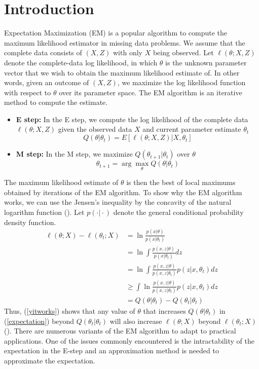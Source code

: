 \documentclass[11pt]{article}
\begin{document}
	\section{Introduction}
	Expectation Maximization (EM) is a popular algorithm to compute the maximum likelihood estimator in missing data problems. We assume that the complete data consists of $(X, Z)$ with only $X$ being observed. Let $\ell(\theta; X, Z)$ denote the complete-data log likelihood, in which $\theta$ is the unknown parameter vector that we wish to obtain the maximum likelihood estimate of. In other words, given an outcome of $(X, Z)$, we maximize the log likelihood function with respect to $\theta$ over its parameter space. The EM algorithm is an iterative method to compute the estimate.
	\begin{itemize}
		\item \textbf{E step:} In the E step, we compute the log likelihood of the complete data $\ell(\theta; X, Z)$ given the observed data $X$ and current parameter estimate $\theta_t$
		\begin{equation}
			\label{expectation}
			Q(\theta \vert \theta_t) = E [\ell(\theta; X, Z) \vert X, \theta_t]
		\end{equation}
		\item \textbf{M step:} In the M step, we maximize $Q(\theta_{t+1} \vert \theta_t)$ over $\theta$ 
		\begin{equation}
			\theta_{t+1} = \arg \max_\theta Q(\theta \vert \theta_t)
		\end{equation}
	\end{itemize}
	The maximum likelihood estimate of $\theta$ is then the best of local maximums obtained by iterations of the EM algorithm. To show why the EM algorithm works, we can use the Jensen's inequality by the concavity of the natural logarithm function (\cite{roche2011algorithm}). Let $p(\cdot \vert \cdot)$ denote the general conditional probability density function.
	\begin{equation}
		\label{yitworks}
		\begin{split}
			\ell(\theta; X) - \ell (\theta_t; X)
			& = \ln \frac{p(x\vert \theta)}{p( x \vert \theta_t) } \\
			& = \ln \int \frac{p(x, z\vert \theta)}{p( x \vert \theta_t)} dz\\
			& = \ln \int \frac{p(x, z\vert \theta)}{p( x,z \vert \theta_t)} p(z \vert x, \theta_t) dz \\
			& \geq \int \ln \frac{p(x, z\vert \theta)}{p( x,z \vert \theta_t)} p(z \vert x, \theta_t) dz \\
			& = Q(\theta \vert \theta_t) - Q(\theta_t \vert \theta_t)
		\end{split}
	\end{equation}
	Thus, (\ref{yitworks}) shows that any value of $\theta$ that increases $Q(\theta \vert \theta_t)$ in (\ref{expectation}) beyond $Q(\theta_t \vert \theta_t)$ will also increase $\ell(\theta; X)$ beyond $\ell(\theta_t; X)$ (\cite{roche2011algorithm}). There are numerous variants of the EM algorithm to adapt to practical applications. One of the issues commonly encountered is the intractability of the expectation in the E-step and an approximation method is needed to approximate the expectation. 
	
\end{document}
